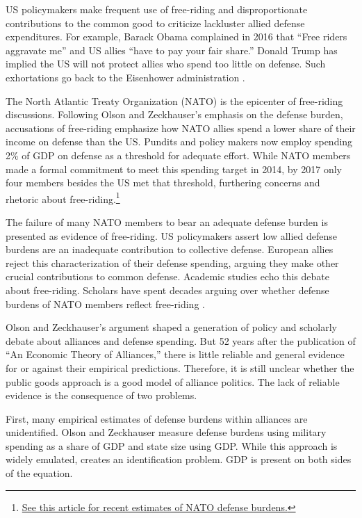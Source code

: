 \documentclass[12pt]{article}
\begin{document}
US policymakers make frequent use of free-riding and disproportionate contributions to the common good to criticize lackluster allied defense expenditures.  
For example, Barack Obama complained in 2016 that ``Free riders aggravate me'' and US allies ``have to pay your fair share.'' 
Donald Trump has implied the US will not protect allies who spend too little on defense. 
Such exhortations go back to the Eisenhower administration \citep{Lanoszka2015}.


The North Atlantic Treaty Organization (NATO) is the epicenter of free-riding discussions. 
Following Olson and Zeckhauser's emphasis on the defense burden, accusations of free-riding emphasize how NATO allies spend a lower share of their income on defense than the US. 
Pundits and policy makers now employ spending 2\% of GDP on defense as a threshold for adequate effort.
While NATO members made a formal commitment to meet this spending target in 2014, by 2017 only four members besides the US met that threshold, furthering concerns and rhetoric about free-riding.\footnote{\href{https://www.economist.com/graphic-detail/2017/02/16/military-spending-by-nato-members}{See this article for recent estimates of NATO defense burdens.}}  


The failure of many NATO members to bear an adequate defense burden is presented as evidence of free-riding. 
US policymakers assert low allied defense burdens are an inadequate contribution to collective defense. 
European allies reject this characterization of their defense spending, arguing they make other crucial contributions to common defense. 
Academic studies echo this debate about free-riding.  
Scholars have spent decades arguing over whether defense burdens of NATO members reflect free-riding \citep{SandlerForbes1980, Palmer1990, GatesTerasawa1992, SandlerHartley2001, Lanoszka2015, PluemperNeumayer2015}.


Olson and Zeckhauser's argument shaped a generation of policy and scholarly debate about alliances and defense spending. 
But 52 years after the publication of ``An Economic Theory of Alliances,'' there is little reliable and general evidence for or against their empirical predictions. 
Therefore, it is still unclear whether the public goods approach is a good model of alliance politics. 
The lack of reliable evidence is the consequence of two problems. 


First, many empirical estimates of defense burdens within alliances are unidentified.
Olson and Zeckhauser measure defense burdens using military spending as a share of GDP and state size using GDP.
While this approach is widely emulated, creates an identification problem. 
GDP is present on both sides of the equation.
\end{document}

